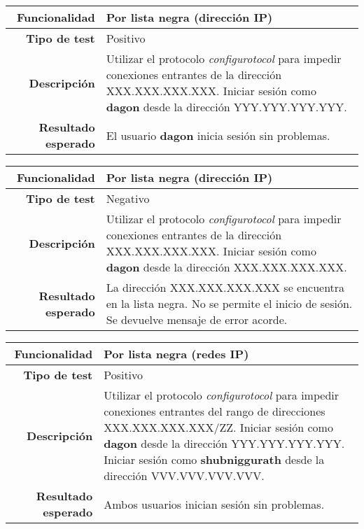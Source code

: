 \documentclass[a4paper,10pt]{article}
\begin{document}
\begin{center}
  \begin{tabular}{|r|p{12.5cm}|}
    \hline
    \textbf{Funcionalidad}	&	Por lista negra (dirección IP)\\
    \hline
    \textbf{Tipo de test}	&	Positivo\\
    \hline
    \textbf{Descripción}	&	Utilizar el protocolo \textit{configurotocol} para impedir conexiones
					entrantes de la dirección XXX.XXX.XXX.XXX. Iniciar sesión como
					\textbf{dagon} desde la dirección YYY.YYY.YYY.YYY.\\
    \hline
    \textbf{Resultado esperado}	&	El usuario \textbf{dagon} inicia sesión sin problemas.\\
    \hline   
  \end{tabular}
\end{center}

\begin{center}
  \begin{tabular}{|r|p{12.5cm}|}
    \hline
    \textbf{Funcionalidad}	&	Por lista negra (dirección IP)\\
    \hline
    \textbf{Tipo de test}	&	Negativo\\
    \hline
    \textbf{Descripción}	&	Utilizar el protocolo \textit{configurotocol} para impedir conexiones
					entrantes de la dirección XXX.XXX.XXX.XXX. Iniciar sesión como
					\textbf{dagon} desde la dirección XXX.XXX.XXX.XXX.\\
    \hline
    \textbf{Resultado esperado}	&	La dirección XXX.XXX.XXX.XXX se encuentra en la lista negra. No se permite
					el inicio de sesión. Se devuelve mensaje de error acorde.\\
    \hline   
  \end{tabular}
\end{center}

\begin{center}
  \begin{tabular}{|r|p{12.5cm}|}
    \hline
    \textbf{Funcionalidad}	&	Por lista negra (redes IP)\\
    \hline
    \textbf{Tipo de test}	&	Positivo\\
    \hline
    \textbf{Descripción}	&	Utilizar el protocolo \textit{configurotocol} para impedir conexiones
					entrantes del rango de direcciones XXX.XXX.XXX.XXX/ZZ. Iniciar sesión como
					\textbf{dagon} desde la dirección YYY.YYY.YYY.YYY. Iniciar sesión como
					\textbf{shubniggurath} desde la dirección VVV.VVV.VVV.VVV.\\
    \hline
    \textbf{Resultado esperado}	&	Ambos usuarios inician sesión sin problemas.\\
    \hline   
  \end{tabular}
\end{center}
\end{document}
